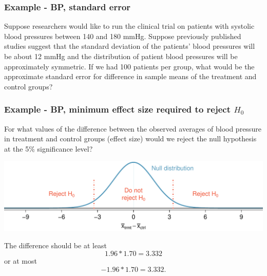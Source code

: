 \begin{frame}
\frametitle{Example - BP, standard error}

{\dq
{\footnotesize
Suppose researchers would like to run the clinical trial on patients with systolic blood pressures between 140 and 180 mmHg. Suppose previously published studies suggest that the standard deviation of the patients' blood pressures will be about 12 mmHg and the distribution of patient blood pressures will be approximately symmetric. If we had 100 patients per group, what would be the approximate standard error for difference in sample means of the treatment and control groups?
}
}

\pause

\soln{
\[ SE = \sqrt{ \frac{12^2}{100} + \frac{12^2}{100} } = 1.70 \]
}

\end{frame}


\begin{frame}
\frametitle{Example - BP, minimum effect size required to reject $H_0$}

{\dq
{\footnotesize
For what values of the difference between the observed averages of blood pressure in treatment and control groups (effect size) would we reject the null hypothesis at the 5\% significance level?}
}

\pause

\includegraphics[width=\textwidth]{7-4_power/figures/power/power_null_B_0_1-7_with_rejection_region}

\pause

The difference should be at least 
\[ 1.96 * 1.70 = 3.332 \] 
or at most 
\[ -1.96 * 1.70 = 3.332. \]

\end{frame}


